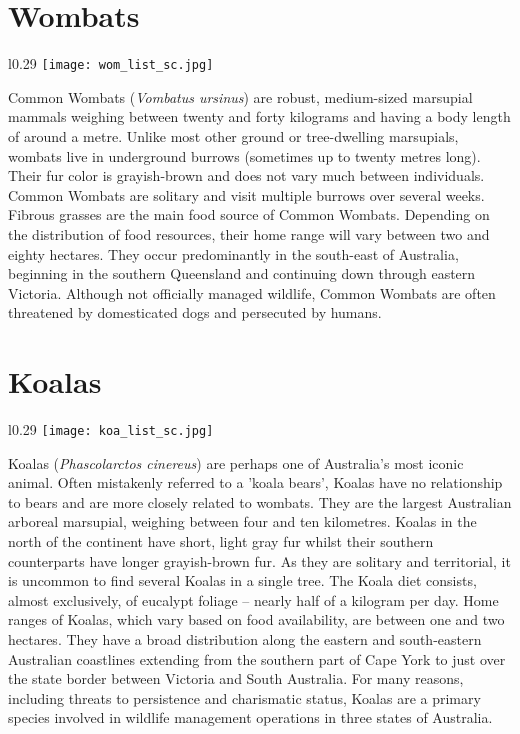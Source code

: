 \newpage
\section{Wombats}\label{wom}
\vspace{-0.3cm}
\setlength\intextsep{0pt}
\begin{wrapfigure}{l}{0.29\textwidth}
\centering
\texttt{[image: wom\_list\_sc.jpg]}
\end{wrapfigure}
Common Wombats (\textit{Vombatus ursinus}) are robust, medium-sized marsupial mammals weighing between twenty and forty kilograms and having a body length of around a metre. Unlike most other ground or tree-dwelling marsupials, wombats live in underground burrows (sometimes up to twenty metres long). Their fur color is grayish-brown and does not vary much between individuals. Common Wombats are solitary and visit multiple burrows over several weeks. Fibrous grasses are the main food source of Common Wombats. Depending on the distribution of food resources, their home range will vary between two and eighty hectares. They occur predominantly in the south-east of Australia, beginning in the southern Queensland and continuing down through eastern Victoria. Although not officially managed wildlife, Common Wombats are often threatened by domesticated dogs and persecuted by humans.

\section{Koalas}\label{koa}
\vspace{-0.3cm}
\setlength\intextsep{0pt}
\begin{wrapfigure}{l}{0.29\textwidth}
\centering
\texttt{[image: koa\_list\_sc.jpg]}
\end{wrapfigure}
Koalas (\textit{Phascolarctos cinereus}) are perhaps one of Australia's most iconic animal. Often mistakenly referred to a 'koala bears', Koalas have no relationship to bears and are more closely related to wombats. They are the largest Australian arboreal marsupial, weighing between four and ten kilometres. Koalas in the north of the continent have short, light gray fur whilst their southern counterparts have longer grayish-brown fur. As they are solitary and territorial, it is uncommon to find several Koalas in a single tree. The Koala diet consists, almost exclusively, of eucalypt foliage -- nearly half of a kilogram per day. Home ranges of Koalas, which vary based on food availability, are between one and two hectares. They have a broad distribution along the eastern and south-eastern Australian coastlines extending from the southern part of Cape York to just over the state border between Victoria and South Australia. For many reasons, including threats to persistence and charismatic status, Koalas are a primary species involved in wildlife management operations in three states of Australia.

